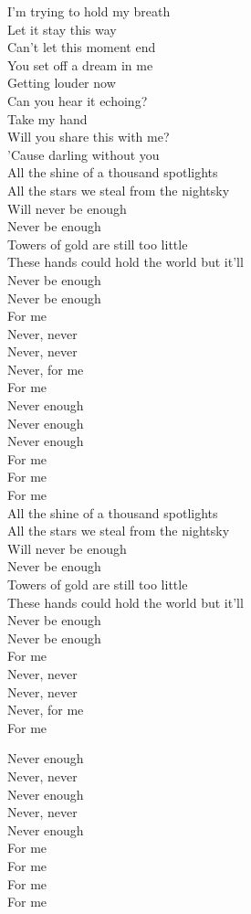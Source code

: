 \begin{flushleft}
I'm trying to hold my breath \tab{}\\
Let it stay this way \tab{} \\
Can't let this moment end \tab{}\\
You set off a dream in me \tab{}\\
Getting louder now \tab{}\\
Can you hear it echoing? \tab{}\\
\hops
Take my hand \tab{} \\
Will you share this with me? \\
'Cause darling without you \\
\hops
All the shine of a thousand spotlights \\
All the stars we steal from the nightsky \\
Will never be enough \tab{}\\
Never be enough \tab{}\\
Towers of gold are still too little \\
These hands could hold the world but it'll \\
Never be enough \tab{}\\
Never be enough \tab{}\\
\hops
For me \\
Never, never\\
Never, never \\
Never, for me \\
For me\\
Never enough \\
Never enough \\
Never enough \\
For me \\
For me\\
For me\\
\hops
All the shine of a thousand spotlights\\
All the stars we steal from the nightsky\\
Will never be enough\\
Never be enough\\
Towers of gold are still too little\\
These hands could hold the world but it'll\\
Never be enough\\
Never be enough\\
\hops
For me\\
Never, never\\
Never, never\\
Never, for me\\
For me

Never enough\\
Never, never\\
Never enough\\
Never, never\\
Never enough\\
For me\\
For me\\
For me\\
For me
\end{flushleft}
\newpage